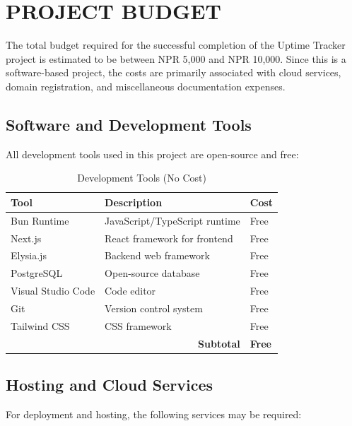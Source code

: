 \chapter{PROJECT BUDGET}

The total budget required for the successful completion of the Uptime Tracker project is estimated to be between NPR 5,000 and NPR 10,000. Since this is a software-based project, the costs are primarily associated with cloud services, domain registration, and miscellaneous documentation expenses.

\section{Software and Development Tools}

All development tools used in this project are open-source and free:

\begin{table}[H]
    \centering
    \small
    \caption{Development Tools (No Cost)}
    \begin{tabular}{p{4cm}p{6cm}p{2.5cm}}
        \toprule
        \textbf{Tool} & \textbf{Description} & \textbf{Cost} \\
        \midrule
        Bun Runtime & JavaScript/TypeScript runtime & Free \\
        Next.js & React framework for frontend & Free \\
        Elysia.js & Backend web framework & Free \\
        PostgreSQL & Open-source database & Free \\
        Visual Studio Code & Code editor & Free \\
        Git & Version control system & Free \\
        Tailwind CSS & CSS framework & Free \\
        \midrule
        \multicolumn{2}{r}{\textbf{Subtotal}} & \textbf{Free} \\
        \bottomrule
    \end{tabular}
    \label{tab:dev_tools}
\end{table}

\section{Hosting and Cloud Services}

For deployment and hosting, the following services may be required:

